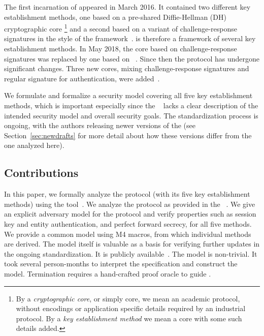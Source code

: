 \documentclass[runningheads, envcountsame, hidelinks, a4paper, draft, x11names]{llncs}
\begin{document}
%
The first incarnation of \mEdhoc{} appeared in March 2016.
%
It contained two different key establishment methods, one based on a
pre-shared Diffie-Hellman (DH) cryptographic core
\footnote{By a \emph{cryptographic core}, or simply core, we mean an academic protocol,
without encodings or application specific details required by an industrial
protocol.
%
By a \emph{key establishment method} we mean a core with some such details added.
}
and a second based on a
variant of challenge-response signatures in the style of the \mNoise{}
framework~\cite{perrin2016noise}.
%
\mEdhoc{} is therefore a framework of several key establishment methods.
%
In May 2018, the core based on challenge-response signatures was replaced by
one based on \mSigma{}~\cite{bruni-analysis-selander-ace-cose-ecdhe-08}.
%
Since then the protocol has undergone significant changes.
%
Three new cores, mixing challenge-response signatures and regular signature for
authentication, were added~\cite{our-analysis-selander-lake-edhoc-00}.
%

We formulate and formalize a security model covering all five key
establishment methods, which is important especially since the
\mSpec{}~\cite{our-analysis-selander-lake-edhoc-00} lacks a clear description
of the intended security model and
overall security goals.
%
The standardization process is ongoing, with the authors releasing newer
versions of the \mSpec{} (see Section~\ref{sec:newdrafts} for more detail
about how these versions differ from the one analyzed here).
%

\subsection{Contributions}
\label{sec:contributions}
In this paper, we formally analyze the \mEdhoc{} protocol (with its five key
establishment methods) using the \mTamarin{} tool~\cite{DBLP:conf/cav/MeierSCB13}.
%
We analyze the protocol as provided in the
\mSpec{}~\cite{our-analysis-selander-lake-edhoc-00}.
%
We give an explicit adversary model for the protocol and verify
properties such as session key and entity authentication, and perfect forward
secrecy, for all five methods.
%
We provide a common \mTamarin{} model using M4 macros, from which
individual methods are derived.
%
The model itself is valuable as a basis for verifying further updates in the
ongoing standardization.
%
It is publicly available~\cite{edhocTamarinRepo}.
%
The model is non-trivial.
%
It took several person-months to interpret the
specification and construct the model.
%
Termination requires a hand-crafted proof oracle to guide \mTamarin{}.
%
\end{document}
